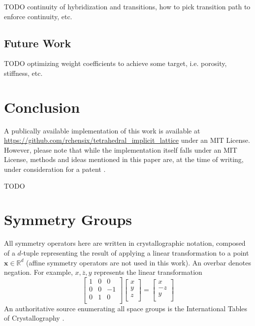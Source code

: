 \documentclass[acmtog]{acmart}
\begin{document}
TODO continuity of hybridization and transitions, how to pick transition path to enforce continuity, etc.

\subsection{Future Work}
TODO optimizing weight coefficients to achieve some target, i.e. porosity, stiffness, etc.

\section{Conclusion}

A publically available implementation of this work is available at \url{https://github.com/rchensix/tetrahedral_implicit_lattice} under an MIT License. However, please note that while the implementation itself falls under an MIT License, methods and ideas mentioned in this paper are, at the time of writing, under consideration for a patent \cite{chen2022systems}.

\begin{acks}
TODO
\end{acks}




\appendix

\section{Symmetry Groups}
\label{sec:symmetry_groups}
All symmetry operators here are written in crystallographic notation, composed of a $d$-tuple representing the result of applying a linear transformation to a point $\mathbf{x} \in \mathbb{R}^d$ (affine symmetry operators are not used in this work). An overbar denotes negation. For example, $x, \overline{z}, y$ represents the linear transformation
\begin{equation}
  \begin{bmatrix}
    1 & 0 & 0 \\
    0 & 0 & -1 \\
    0 & 1 & 0 \\
  \end{bmatrix}
  \begin{bmatrix}
    x \\
    y \\
    z \\
  \end{bmatrix}
  =
  \begin{bmatrix}
    x \\
    -z \\
    y \\
  \end{bmatrix}
\end{equation}
An authoritative source enumerating all space groups is the International Tables of Crystallography \cite{aroyo2016}.
\end{document}
